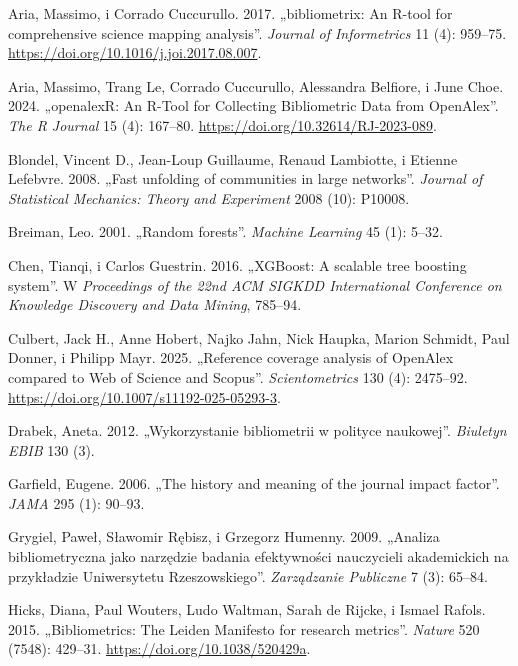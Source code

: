 \documentclass[
  polish,
  12pt,
  a4paper,
]{article}
\newlength{\cslhangindent}
\newenvironment{CSLReferences}[2] %
 {\begin{list}{}{%
  \setlength{\itemindent}{0pt}
  \setlength{\leftmargin}{0pt}
  \setlength{\parsep}{0pt}
  \ifodd #1
   \setlength{\leftmargin}{\cslhangindent}
   \setlength{\itemindent}{-1\cslhangindent}
  \fi
  \setlength{\itemsep}{#2\baselineskip}}}
 {\end{list}}
\begin{document}
\label{refs}
\begin{CSLReferences}{1}{0}
Aria, Massimo, i Corrado Cuccurullo. 2017. {„bibliometrix: An {R}-tool
for comprehensive science mapping analysis''}. \emph{Journal of
Informetrics} 11 (4): 959--75.
\url{https://doi.org/10.1016/j.joi.2017.08.007}.

Aria, Massimo, Trang Le, Corrado Cuccurullo, Alessandra Belfiore, i June
Choe. 2024. {„{openalexR}: An {R}-Tool for Collecting Bibliometric Data
from {OpenAlex}''}. \emph{The R Journal} 15 (4): 167--80.
\url{https://doi.org/10.32614/RJ-2023-089}.

Blondel, Vincent D., Jean-Loup Guillaume, Renaud Lambiotte, i Etienne
Lefebvre. 2008. {„Fast unfolding of communities in large networks''}.
\emph{Journal of Statistical Mechanics: Theory and Experiment} 2008
(10): P10008.

Breiman, Leo. 2001. {„Random forests''}. \emph{Machine Learning} 45 (1):
5--32.

Chen, Tianqi, i Carlos Guestrin. 2016. {„{XGBoost}: A scalable tree
boosting system''}. W \emph{Proceedings of the 22nd ACM SIGKDD
International Conference on Knowledge Discovery and Data Mining},
785--94.

Culbert, Jack H., Anne Hobert, Najko Jahn, Nick Haupka, Marion Schmidt,
Paul Donner, i Philipp Mayr. 2025. {„Reference coverage analysis of
{OpenAlex} compared to {Web of Science} and {Scopus}''}.
\emph{Scientometrics} 130 (4): 2475--92.
\url{https://doi.org/10.1007/s11192-025-05293-3}.

Drabek, Aneta. 2012. {„Wykorzystanie bibliometrii w polityce
naukowej''}. \emph{Biuletyn EBIB} 130 (3).

Garfield, Eugene. 2006. {„The history and meaning of the journal impact
factor''}. \emph{JAMA} 295 (1): 90--93.

Grygiel, Paweł, Sławomir Rębisz, i Grzegorz Humenny. 2009. {„Analiza
bibliometryczna jako narzędzie badania efektywności nauczycieli
akademickich na przykładzie {Uniwersytetu Rzeszowskiego}''}.
\emph{Zarządzanie Publiczne} 7 (3): 65--84.

Hicks, Diana, Paul Wouters, Ludo Waltman, Sarah de Rijcke, i Ismael
Rafols. 2015. {„Bibliometrics: The {Leiden Manifesto} for research
metrics''}. \emph{Nature} 520 (7548): 429--31.
\url{https://doi.org/10.1038/520429a}.


\end{CSLReferences}
\end{document}
